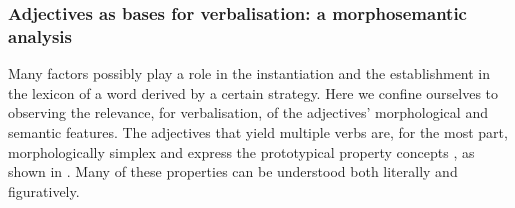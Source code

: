 \documentclass[output=paper,colorlinks,citecolor=brown]{langscibook}
\begin{document}
\subsubsection{Adjectives as bases for verbalisation: a morphosemantic analysis}
\label{sec:adj2}

Many factors possibly play a role in the instantiation and the establishment in the lexicon of a word derived by a certain strategy. Here we confine ourselves to observing the relevance, for verbalisation, of the adjectives’ morphological and semantic features. The adjectives that yield multiple verbs are, for the most part, morphologically simplex and express the prototypical property concepts \citep{Dixon1982}, as shown in . Many of these properties can be understood both literally and figuratively.
\end{document}
